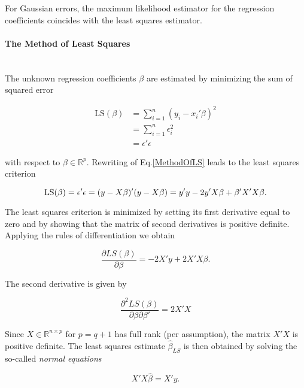 \documentclass[10pt,a4paper]{article}
\newcommand{\subsubsubsection}[1]{\paragraph{#1}\mbox{}\\}
\begin{document}
For Gaussian errors, the maximum likelihood estimator for the regression coefficients coincides with the least squares estimator. 

\subsubsubsection{The Method of Least Squares}

The unknown regression coefficients $\beta$ are estimated by minimizing the sum of squared error

\begin{equation} \label{MethodOfLS} 
\begin{split} 
\text{LS}(\beta) &=  \sum_{i=1}^n(y_i - x_i'\beta)^2 \\ 
	&= \sum_{i=1}^n\epsilon_i^2  \\
	&= \epsilon'\epsilon
\end{split}
\end{equation}

with respect to $\beta \in \mathbb{R}^p$. Rewriting of Eq.\ref{MethodOfLS} leads to the least squares criterion

\begin{equation*}
\text{LS}(\beta) = \epsilon'\epsilon \\ = (y - X\beta)'(y - X\beta) \\ = y'y - 2y'X\beta + \beta'X'X\beta.
\end{equation*}

The least squares criterion is minimized by setting its first derivative equal to zero and by showing that the matrix of second derivatives is positive definite. Applying the rules of differentiation we obtain

\begin{equation*}
\frac{\partial LS(\beta)}{\partial \beta} = -2X' y + 2X'X\beta.
\end{equation*}

The second derivative is given by

\begin{equation*}
\frac{\partial^2LS(\beta)}{\partial\beta \partial \beta'} = 2X'X
\end{equation*}
	
Since $X \in \mathbb{R}^{n \times p}$ for $p = q + 1$ has full rank (per assumption), the matrix $X'X$ is positive definite. The least squares estimate $\hat \beta_{LS}$ is then obtained by solving the so-called \emph{normal equations}

\begin{equation} \label{NormalEquations}
X'X \hat \beta = X'y.
\end{equation}
\end{document}

